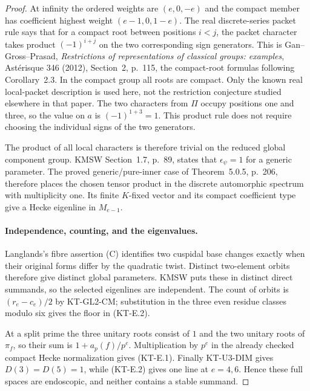 \begin{proof}
At infinity the ordered weights are $(e,0,-e)$ and the compact
member has coefficient highest weight $(e-1,0,1-e)$.
The real discrete-series packet rule says that for a compact
root between positions $i<j$, the packet character takes product
$(-1)^{i+j}$ on the two corresponding sign generators.
This is Gan--Gross--Prasad, \emph{Restrictions of representations
of classical groups: examples}, Ast\'erisque 346 (2012),
Section~2, p.~115, the compact-root formulas following
Corollary~2.3. In the compact group all roots are compact.
Only the known real local-packet description is used here,
not the restriction conjecture studied elsewhere in that paper.
The two characters from $\Pi$ occupy positions one and three,
so the value on $a$ is $(-1)^{1+3}=1$.
This product rule does not require choosing the individual signs
of the two generators.

The product of all local characters is therefore trivial on
the reduced global component group. KMSW Section~1.7,
p.~89, states that $\epsilon_\psi=1$ for a generic parameter.
The proved generic/pure-inner case of Theorem~5.0.5, p.~206,
therefore places the chosen tensor product in the discrete
automorphic spectrum with multiplicity one. Its finite
$K$-fixed vector and its compact coefficient type give a
Hecke eigenline in $M_{e-1}$.

\paragraph{Independence, counting, and the eigenvalues.}
Langlands's fibre assertion (C) identifies two cuspidal base
changes exactly when their original forms differ by the
quadratic twist. Distinct two-element orbits therefore give
distinct global parameters. KMSW puts these in distinct
direct summands, so the selected eigenlines are independent.
The count of orbits is $(r_e-c_e)/2$ by KT-GL2-CM;
substitution in the three even residue classes modulo six
gives the floor in (KT-E.2).

At a split prime the three unitary roots consist of $1$ and
the two unitary roots of $\pi_f$, so their sum is
$1+a_p(f)/p^e$. Multiplication by $p^e$ in the already checked
compact Hecke normalization gives (KT-E.1).
Finally KT-U3-DIM gives $D(3)=D(5)=1$, while (KT-E.2)
gives one line at $e=4,6$. Hence these full spaces are
endoscopic, and neither contains a stable summand.
\end{proof}

